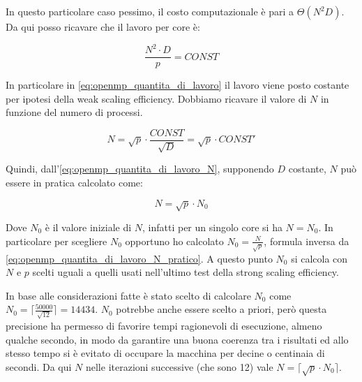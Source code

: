 \documentclass[11pt, a4paper]{article}
\begin{document}
In questo particolare caso pessimo, il costo computazionale è pari a \(\Theta(N^2D)\).
Da qui posso ricavare che il lavoro per core è:

\begin{equation} \label{eq:openmp_quantita_di_lavoro}
  \frac{N^2 \cdot D}{p} = CONST
\end{equation}

In particolare in \autoref{eq:openmp_quantita_di_lavoro} il lavoro viene posto costante per ipotesi della weak scaling efficiency.
Dobbiamo ricavare il valore di \(N\) in funzione del numero di processi.

\begin{equation} \label{eq:openmp_quantita_di_lavoro_N}
  N = \sqrt{p} \cdot \frac{CONST}{\sqrt{D}} = \sqrt{p} \cdot CONST'
\end{equation}

Quindi, dall'\autoref{eq:openmp_quantita_di_lavoro_N}, supponendo \(D\) costante, \(N\) può essere in pratica calcolato come:

\begin{equation} \label{eq:openmp_quantita_di_lavoro_N_pratico}
  N = \sqrt{p} \cdot N_0
\end{equation}

Dove \(N_0\) è il valore iniziale di \(N\), infatti per un singolo core si ha \(N = N_0\).
In particolare per scegliere \(N_0\) opportuno ho calcolato \(N_0 = \frac{N}{\sqrt{p}}\), formula inversa da
\autoref{eq:openmp_quantita_di_lavoro_N_pratico}.
A questo punto \(N_0\) si calcola con \(N\) e \(p\) scelti uguali a quelli usati nell'ultimo test della strong scaling efficiency.

In base alle considerazioni fatte è stato scelto di calcolare \(N_0\) come \(N_0 = \lceil \frac{50000}{\sqrt{12}} \rceil =
14434\).
\(N_0\) potrebbe anche essere scelto a priori, però questa precisione ha permesso di favorire tempi ragionevoli di esecuzione,
almeno qualche secondo, in modo da garantire una buona coerenza tra i risultati ed allo stesso tempo si è evitato di occupare
la macchina per decine o centinaia di secondi.
Da qui \(N\) nelle iterazioni successive (che sono 12) vale \(N = \lceil \sqrt{p} \cdot N_0 \rceil\).
\end{document}
